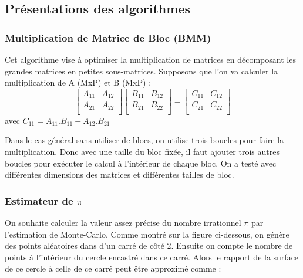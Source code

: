 \documentclass[12pt,a4paper]{article}
\begin{document}
\subsection{Présentations des algorithmes}
\subsubsection{Multiplication de Matrice de Bloc (BMM)}
Cet algorithme vise à optimiser la multiplication de matrices en décomposant les grandes matrices en petites sous-matrices. Supposons que l’on va calculer la multiplication de A (MxP) et B (MxP) :
$$
\begin{bmatrix}
A_{11} & A_{12}\\
A_{21} & A_{22}\\
\end{bmatrix}
\begin{bmatrix}
B_{11} & B_{12}\\
B_{21} & B_{22}\\
\end{bmatrix}
=
\begin{bmatrix}
C_{11} & C_{12}\\
C_{21} & C_{22}\\
\end{bmatrix}
$$
avec $ C_{11} = A_{11}.B_{11} + A_{12}.B_{21}$

Dans le cas général sans utiliser de blocs, on utilise trois boucles pour faire la multiplication. Donc avec une taille du bloc fixée, il faut ajouter trois autres boucles pour exécuter le calcul à l’intérieur de chaque bloc. On a testé avec différentes dimensions des matrices et différentes tailles de bloc. 

\subsubsection{Estimateur de $\pi$}
On souhaite calculer la valeur assez précise du nombre irrationnel $\pi$ par l'estimation de Monte-Carlo. Comme montré sur la figure ci-dessous, on génère des points aléatoires dans d’un carré de côté 2. Ensuite on compte le nombre de points à l’intérieur du cercle encastré dans ce carré. Alors le rapport de la surface de ce cercle à celle de ce carré peut être approximé comme :
\end{document}

